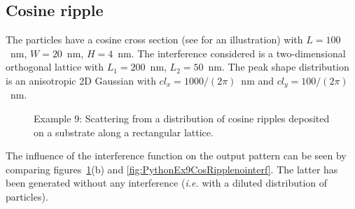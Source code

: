\subsection{Cosine ripple}
The particles have a cosine cross section (see  for an illustration) with $L=100$~nm, $W=20$~nm, $H=4$~nm.
The interference considered is a two-dimensional orthogonal lattice with $L_1=200$~nm, $L_2=50$~nm. The peak shape distribution is an anisotropic 2D Gaussian with $cl_x=1000/(2\pi)$~nm and  $cl_y=100/(2\pi)$~nm.

\begin{figure}[H]
\hfill
{}
\hfill
{}
\hfill
\caption{Example 9: Scattering from a distribution of cosine ripples deposited on a substrate along a rectangular lattice.}
\label{fig:PythonEx9CosRipple}
\end{figure}

The influence of the interference function on the output pattern can be seen by comparing figures~\ref{fig:PythonEx9CosRipple}(b) and \ref{fig:PythonEx9CosRipplenointerf}. The latter has been generated without any interference (\textit{i.e.} with a diluted distribution of particles).

